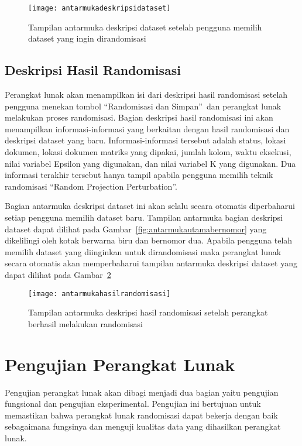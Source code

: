 \begin{figure}
	\centering
	\texttt{[image: antarmukadeskripsidataset]}
	\caption{Tampilan antarmuka deskripsi dataset setelah pengguna memilih dataset yang ingin dirandomisasi}
	\label{fig:antarmukadeskripsidataset}
\end{figure}

\subsection{Deskripsi Hasil Randomisasi}
\label{sec:masukanpengaturan}

Perangkat lunak akan menampilkan isi dari deskripsi hasil randomisasi setelah pengguna menekan tombol \textquotedblleft Randomisasi dan Simpan\textquotedblright~dan perangkat lunak melakukan proses randomisasi. Bagian deskripsi hasil randomisasi ini akan menampilkan informasi-informasi yang berkaitan dengan hasil randomisasi dan deskripsi dataset yang baru. Informasi-informasi tersebut adalah status, lokasi dokumen, lokasi dokumen matriks yang dipakai, jumlah kolom, waktu eksekusi, nilai variabel Epsilon yang digunakan, dan nilai variabel K yang digunakan. Dua informasi terakhir tersebut hanya tampil apabila pengguna memilih teknik randomisasi \textquotedblleft Random Projection Perturbation\textquotedblright.

Bagian antarmuka deskripsi dataset ini akan selalu secara otomatis diperbaharui setiap pengguna memilih dataset baru. Tampilan antarmuka bagian deskripsi dataset dapat dilihat pada Gambar~\ref{fig:antarmukautamabernomor} yang dikelilingi oleh kotak berwarna biru dan bernomor dua. Apabila pengguna telah memilih dataset yang diinginkan untuk dirandomisasi maka perangkat lunak secara otomatis akan memperbaharui tampilan antarmuka deskripsi dataset yang dapat dilihat pada Gambar~\ref{fig:antarmukahasilrandomisasi}

\begin{figure}
	\centering
	\texttt{[image: antarmukahasilrandomisasi]}
	\caption{Tampilan antarmuka deskripsi hasil randomisasi setelah perangkat berhasil melakukan randomisasi}
	\label{fig:antarmukahasilrandomisasi}
\end{figure}

\section{Pengujian Perangkat Lunak}
\label{sec:pengujianpl}

Pengujian perangkat lunak akan dibagi menjadi dua bagian yaitu pengujian fungsional dan pengujian eksperimental. Pengujian ini bertujuan untuk memastikan bahwa perangkat lunak randomisasi dapat bekerja dengan baik sebagaimana fungsinya dan menguji kualitas data yang dihasilkan perangkat lunak.

